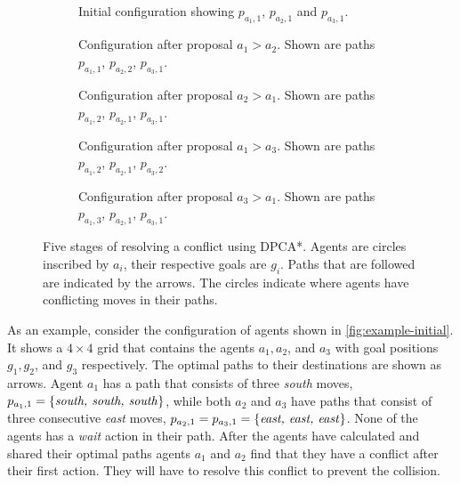 \begin{figure*}[t]
    \centering
    \begin{subfigure}[t]{.3\textwidth}
        \centering
        \def\svgscale{.6}
        
        \caption{Initial configuration showing $p_{a_1,1}$, $p_{a_2,1}$ and 
            $p_{a_3,1}$.}
        \label{fig:example-initial}
    \end{subfigure}
    \qquad
    \begin{subfigure}[t]{.3\textwidth}
        \centering
        \def\svgscale{.6}
        
        \caption{Configuration after proposal $a_1 > a_2$. Shown are paths 
        $p_{a_1,1}$, $p_{a_2,2}$, $p_{a_3,1}$.}
        \label{fig:example2}
    \end{subfigure}
    \qquad
    \begin{subfigure}[t]{.3\textwidth}
        \centering
        \def\svgscale{.6}
        
        \caption{Configuration after proposal $a_2 > a_1$. Shown are paths 
        $p_{a_1,2}$, $p_{a_2,1}$, $p_{a_3,1}$.}
        \label{fig:example3}
    \end{subfigure}
    
    \begin{subfigure}[t]{.45\textwidth}
        \centering
        \def\svgscale{.6}
        
        \caption{Configuration after proposal $a_1 > a_3$. Shown are paths 
        $p_{a_1,2}$, $p_{a_2,1}$, $p_{a_3,2}$.}
        \label{fig:example4}
    \end{subfigure}
    \qquad
    \begin{subfigure}[t]{.45\textwidth}
        \centering
        \def\svgscale{.6}
        
        \caption{Configuration after proposal $a_3 > a_1$. Shown are paths 
        $p_{a_1,3}$, $p_{a_2,1}$, $p_{a_3,1}$.}
        \label{fig:example5}
    \end{subfigure}
    
    \caption{Five stages of resolving a conflict using DPCA*. Agents are 
    circles inscribed
        by $a_i$, their respective goals are $g_i$. Paths that are followed are
        indicated by the arrows. The circles indicate where agents have 
        conflicting moves in their paths.}
    \label{fig:example}
\end{figure*}

As an example, consider the configuration of agents shown in 
\autoref{fig:example-initial}. It 
shows a $4 \times 4$ grid that contains the agents $a_1, a_2$, and $a_3$ with 
goal positions $g_1, g_2$, and $g_3$ respectively. The optimal paths to their 
destinations are shown as arrows. Agent $a_1$ has a path that consists of three 
\emph{south} moves, $p_{a_1,1} = \{\text{\emph{south, south, south}}\}$, while 
both $a_2$ and $a_3$ have paths that consist of three consecutive \emph{east} 
moves, $p_{a_2,1} = p_{a_3,1} = \{\text{\emph{east, east, east}}\}$. None of 
the agents has a \emph{wait} action in their path. After the agents have 
calculated and shared their optimal paths agents $a_1$ and $a_2$ find that they 
have a conflict after their first action. They will have to resolve this 
conflict to prevent the collision.

